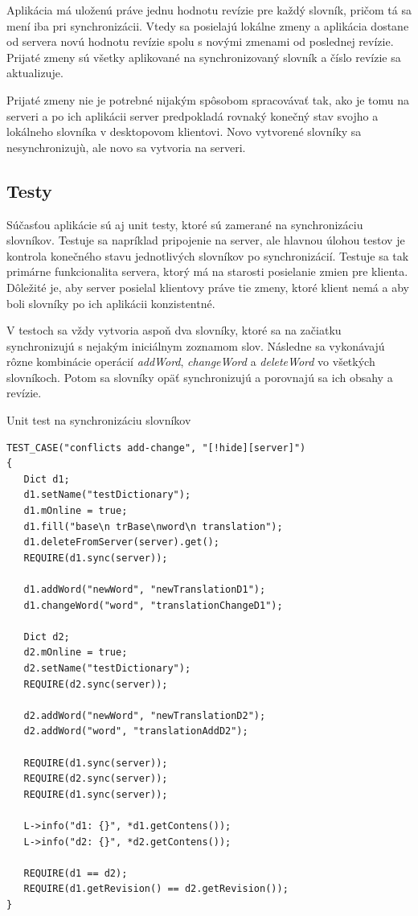 \documentclass[
  digital, %
  table,   %
  lof,     %
  lot,     %
]{fithesis3}
\begin{document}
Aplikácia má uloženú práve jednu hodnotu revízie pre každý slovník, pričom tá sa mení iba pri synchronizácii. Vtedy sa posielajú lokálne zmeny a aplikácia dostane od servera novú hodnotu revízie spolu s novými zmenami od poslednej revízie. Prijaté zmeny sú všetky aplikované na synchronizovaný slovník a číslo revízie sa aktualizuje.

Prijaté zmeny nie je potrebné nijakým spôsobom spracovávať tak, ako je tomu na serveri a po ich aplikácii server predpokladá rovnaký konečný stav svojho a lokálneho slovníka v desktopovom klientovi. Novo vytvorené slovníky sa nesynchronizujù, ale novo sa vytvoria na serveri.

\subsection{Testy}
Súčasťou aplikácie sú aj unit testy, ktoré sú zamerané na synchronizáciu slovníkov. Testuje sa napríklad pripojenie na server, ale hlavnou úlohou testov je kontrola konečného stavu jednotlivých slovníkov po synchronizácií. Testuje sa tak primárne funkcionalita servera, ktorý má na starosti posielanie zmien pre klienta. Dôležité je, aby server posielal klientovy práve tie zmeny, ktoré klient nemá a aby boli slovníky po ich aplikácii konzistentné.

V testoch sa vždy vytvoria aspoň dva slovníky, ktoré sa na začiatku synchronizujú s nejakým iniciálnym zoznamom slov. Následne sa vykonávajú rôzne kombinácie operácií \textit{addWord}, \textit{changeWord} a \textit{deleteWord} vo všetkých slovníkoch. Potom sa slovníky opäť synchronizujú a porovnajú sa ich obsahy a revízie.

\begin{exmp}
\label{exmp:test}
Unit test na synchronizáciu slovníkov
\centering
\begin{lstlisting}[basicstyle=\small]
TEST_CASE("conflicts add-change", "[!hide][server]")
{
   Dict d1;
   d1.setName("testDictionary");
   d1.mOnline = true;
   d1.fill("base\n trBase\nword\n translation");
   d1.deleteFromServer(server).get();
   REQUIRE(d1.sync(server));

   d1.addWord("newWord", "newTranslationD1");
   d1.changeWord("word", "translationChangeD1");

   Dict d2;
   d2.mOnline = true;
   d2.setName("testDictionary");
   REQUIRE(d2.sync(server));

   d2.addWord("newWord", "newTranslationD2");
   d2.addWord("word", "translationAddD2");

   REQUIRE(d1.sync(server));
   REQUIRE(d2.sync(server));
   REQUIRE(d1.sync(server));

   L->info("d1: {}", *d1.getContens());
   L->info("d2: {}", *d2.getContens());

   REQUIRE(d1 == d2);
   REQUIRE(d1.getRevision() == d2.getRevision());
}
\end{lstlisting}
\end{exmp}
\end{document}
